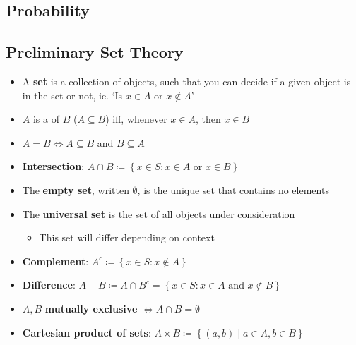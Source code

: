 \documentclass{report}
\begin{document}
\begin{enumerate}
\chapter{Probability}

	\section{Preliminary Set Theory}

		\begin{itemize}
			\item A \textbf{set} is a collection of objects, such that you can decide if a given object is in the set or not, ie. `Is $x \in A$ or $x \notin A$'
			\item $A$ is a  of $B$ ($A \subseteq B$) iff, whenever $x \in A$, then $x \in B$
			\item $A = B \Leftrightarrow A \subseteq B$ and $B \subseteq A$
			\item \textbf{Intersection}: $A \cap B \coloneq \left\{x \in S: x \in A \text{ or } x \in B \right\}$
			\item The \textbf{empty set}, written $\emptyset$, is the unique set that contains no elements
			\item The \textbf{universal set} is the set of all objects under consideration
				\begin{itemize}
					\item This set will differ depending on context
				\end{itemize}
			\item \textbf{Complement}: $A^c \coloneq \left\{ x \in S: x \notin A \right\}$
			\item \textbf{Difference}: $A - B \coloneq A \cap B^c = \left\{x \in S : x \in A \text{ and } x \notin B \right\}$
			\item $A, B$ \textbf{mutually exclusive} $\Leftrightarrow A \cap B = \emptyset$
			\item \textbf{Cartesian product of sets}: $A \times B \coloneq \left\{(a,b) \middle| a \in A, b \in B\right\}$
		\end{itemize}


\end{enumerate}
\end{document}
